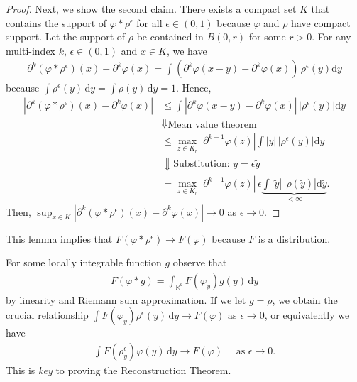 \begin{proof}
    Next, we show the second claim. There exists a compact set \(K\) that contains the support of \(\varphi * \rho^{\epsilon}\) for all \(\epsilon \in (0,1)\) because \( \varphi \) and \( \rho \) have compact support. Let the support of \({\rho}\) be contained in \(B(0,r)\) for some \(r > 0\). For any multi-index \(k\), \(\epsilon \in (0,1)\) and \(x \in K\), we have
    \begin{align*}
        \partial^k(\varphi * \rho^\epsilon) (x) - \partial^k\varphi(x) = \int (\partial^k \varphi(x - y) - \partial^k \varphi(x)) \, \rho^{\epsilon}(y) \mathrm{d}y
    \end{align*}
    because \(\int \rho^{\epsilon}(y) \, \mathrm{d} y = \int \rho(y) \, \mathrm{d} y = 1\). Hence, 
    \begin{align*}
        |\partial^k(\varphi * \rho^\epsilon) (x) - \partial^k\varphi(x)| 
        &\leq \int |\partial^k \varphi(x - y) - \partial^k \varphi(x)| \, |\rho^{\epsilon}(y)| \mathrm{d}y \\
        &\Downarrow \text{Mean value theorem} \\
        & \leq \max_{z \in K_r} |\partial^{k+1}\varphi(z)|  \int  |y| \, |\rho^{\epsilon}(y)| \mathrm{d}y \\
        &\Downarrow \text{Substitution: } y = \epsilon \tilde y \\
        &= \max_{z \in K_r} |\partial^{k+1}\varphi(z)| \, \epsilon  \underbrace{\int  |\tilde y| \, |\rho(\tilde y)| \mathrm{d}\tilde y}_{< \infty}.
    \end{align*}
    Then, \(\sup_{x \in K} |\partial^k(\varphi * \rho^\epsilon) (x) - \partial^k\varphi(x)| \to 0\) as \(\epsilon \to 0\).
\end{proof}

This lemma implies that \(F(\varphi * \rho^{\epsilon}) \to F(\varphi)\) because \(F\) is a distribution.

For some locally integrable function \( g \) observe that 
\begin{align}\label{lemma:mollified-distribution}
    F(\varphi * g) = \int_{\mathbb{R}^d} F(\varphi_y)g(y) \, \mathrm{d}y
\end{align}
by linearity and Riemann sum approximation. If we let \(g = {\rho}\), we obtain the crucial relationship \(\int F(\varphi_y)\rho^{\epsilon}(y) \, \mathrm{d}y \to F(\varphi)\) as \(\epsilon \to 0\), or equivalently we have
\begin{align}\label{eq:starting-point}
    \int F(\rho_y^\epsilon) \varphi(y)\, \mathrm{d}y \to F(\varphi) \quad \text{ as } \epsilon \to 0.
\end{align}
This is \emph{key} to proving the Reconstruction Theorem. 

